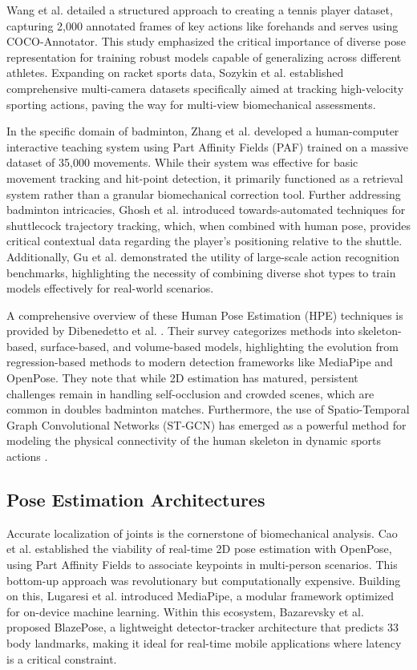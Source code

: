 \documentclass[pdflatex,sn-mathphys-num]{sn-jnl}
\theoremstyle{thmstyleone}%
\theoremstyle{thmstyletwo}%
\theoremstyle{thmstylethree}%
\begin{document}
Wang et al. \cite{b4} detailed a structured approach to creating a tennis player dataset, capturing 2,000 annotated frames of key actions like forehands and serves using COCO-Annotator. This study emphasized the critical importance of diverse pose representation for training robust models capable of generalizing across different athletes. Expanding on racket sports data, Sozykin et al. \cite{b5} established comprehensive multi-camera datasets specifically aimed at tracking high-velocity sporting actions, paving the way for multi-view biomechanical assessments.

In the specific domain of badminton, Zhang et al. \cite{b6} developed a human-computer interactive teaching system using Part Affinity Fields (PAF) trained on a massive dataset of 35,000 movements. While their system was effective for basic movement tracking and hit-point detection, it primarily functioned as a retrieval system rather than a granular biomechanical correction tool. Further addressing badminton intricacies, Ghosh et al. \cite{b7} introduced towards-automated techniques for shuttlecock trajectory tracking, which, when combined with human pose, provides critical contextual data regarding the player's positioning relative to the shuttle. Additionally, Gu et al. \cite{b8} demonstrated the utility of large-scale action recognition benchmarks, highlighting the necessity of combining diverse shot types to train models effectively for real-world scenarios.

A comprehensive overview of these Human Pose Estimation (HPE) techniques is provided by Dibenedetto et al. \cite{b9}. Their survey categorizes methods into skeleton-based, surface-based, and volume-based models, highlighting the evolution from regression-based methods to modern detection frameworks like MediaPipe and OpenPose. They note that while 2D estimation has matured, persistent challenges remain in handling self-occlusion and crowded scenes, which are common in doubles badminton matches. Furthermore, the use of Spatio-Temporal Graph Convolutional Networks (ST-GCN) has emerged as a powerful method for modeling the physical connectivity of the human skeleton in dynamic sports actions \cite{b10}.

\subsection{Pose Estimation Architectures}
Accurate localization of joints is the cornerstone of biomechanical analysis. Cao et al. \cite{b11} established the viability of real-time 2D pose estimation with OpenPose, using Part Affinity Fields to associate keypoints in multi-person scenarios. This bottom-up approach was revolutionary but computationally expensive. Building on this, Lugaresi et al. \cite{b12} introduced MediaPipe, a modular framework optimized for on-device machine learning. Within this ecosystem, Bazarevsky et al. \cite{b13} proposed BlazePose, a lightweight detector-tracker architecture that predicts 33 body landmarks, making it ideal for real-time mobile applications where latency is a critical constraint.
\end{document}
